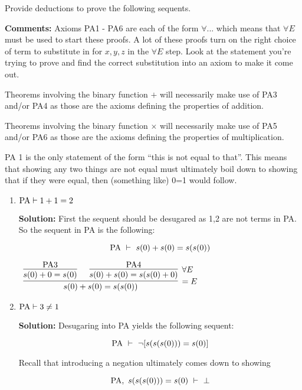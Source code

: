 \documentclass[11pt]{report}
\begin{document}
\begin{enumerate}
	Provide deductions to prove the following sequents. 

	{\bf Comments:} Axioms PA1 - PA6 are each of the form $\forall ...$ which means that $\forall E$ must be used to start these proofs. A lot of these proofs turn on the right choice of term to substitute in for $x,y,z$ in the $\forall E$ step. Look at the statement you're trying to prove and find the correct substitution into an axiom to make it come out. 

	Theorems involving the binary function $+$ will necessarily make use of PA3 and/or PA4 as those are the axioms defining the properties of addition. 

	Theorems involving the binary function $\times$ will necessarily make use of PA5 and/or PA6 as those are the axioms defining the properties of multiplication. 

	PA 1 is the only statement of the form ``this is not equal to that''. This means that showing any two things are not equal must ultimately boil down to showing that if they were equal, then (something like) 0=1 would follow.
	
	\newpage
	\begin{enumerate}
		\item $\text{PA} \vdash 1 + 1 = 2$
		
		{\bf Solution:} First the sequent should be desugared as 1,2 are not terms in PA. So the sequent in PA is the following: 

		$$ \text{PA} \ \vdash \ s(0) + s(0) = s(s(0))$$

		\begin{mdframed}
			\begin{center}
				$\begin{array}{c}
					\infer[=E]{s(0) + s(0) = s(s(0))}
						{\infer[]{s(0) + 0 = s(0)}
							{\PA 3}
						&
						\infer[\forall E]{s(0) + s(0) = s(s(0) + 0)}
							{\PA 4}}
				\end{array}$
			\end{center}
		\end{mdframed}
		
		\item $\text{PA} \vdash 3 \neq 1$
		
		{\bf Solution:} Desugaring into PA yields the following sequent:

		$$ \text{PA} \ \vdash \ \lnot[s(s(s(0))) = s(0)]$$

		Recall that introducing a negation ultimately comes down to showing 

		$$ \PA, \ s(s(s(0))) = s(0) \ \vdash \ \bot$$


\end{enumerate}
\end{enumerate}
\end{document}
